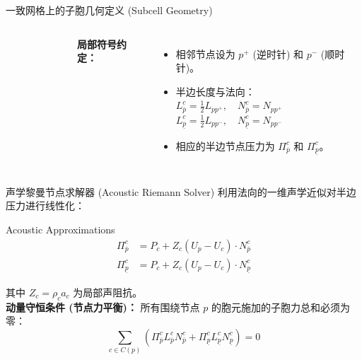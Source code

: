 \documentclass{beamer}
\begin{document}
	\begin{frame}{一致网格上的子胞几何定义 (Subcell Geometry)}
		\begin{columns}
			\begin{figure}[htpb]
				\centering
				\fbox{\begin{minipage}[c][4cm][c]{\linewidth}
						\centering
						\textcolor{gray}{[图片占位] 图 1: \\ 四边形胞元 $\Omega_c$ 符号定义}
				\end{minipage}}
			\end{figure}
			
			\textbf{局部符号约定：}
			\begin{itemize}
				\item 相邻节点设为 $p^+$ (逆时针) 和 $p^-$ (顺时针)。
				\item 半边长度与法向：\\
				$L_{\overline{p}}^c = \frac{1}{2}L_{pp^+}, \quad N_{\overline{p}}^c = N_{pp^+}$ \\
				$L_{\underline{p}}^c = \frac{1}{2}L_{pp^-}, \quad N_{\underline{p}}^c = N_{pp^-}$
				\item 相应的半边节点压力为 $\Pi_{\overline{p}}^c$ 和 $\Pi_{\underline{p}}^c$。
			\end{itemize}
		\end{columns}
	\end{frame}
	
	\begin{frame}{声学黎曼节点求解器 (Acoustic Riemann Solver)}
		利用法向的一维声学近似对半边压力进行线性化：
		\begin{exampleblock}{Acoustic Approximations}
			\begin{align*}
				\Pi_{\overline{p}}^c &= P_c + Z_c(U_p - U_c)\cdot N_{\overline{p}}^c \\
				\Pi_{\underline{p}}^c &= P_c + Z_c(U_p - U_c)\cdot N_{\underline{p}}^c
			\end{align*}
		\end{exampleblock}
		\vspace{0.2cm}
		其中 $Z_c = \rho_c a_c$ 为局部声阻抗。\\
		\vspace{0.3cm}
		\textbf{动量守恒条件 (节点力平衡)：} 所有围绕节点 $p$ 的胞元施加的子胞力总和必须为零：
		\begin{equation*}
			\sum_{c\in C(p)} \left(\Pi_{\overline{p}}^c L_{\overline{p}}^c N_{\overline{p}}^c + \Pi_{\underline{p}}^c L_{\underline{p}}^c N_{\underline{p}}^c \right) = 0
		\end{equation*}
	\end{frame}
	
\end{document}
